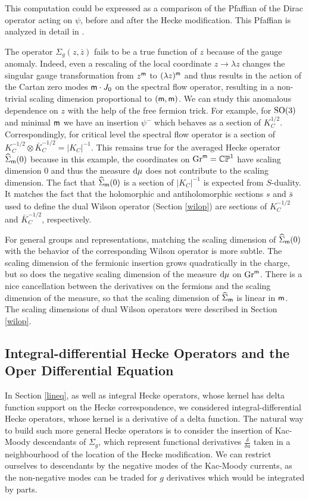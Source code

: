 \documentclass[11pt,a4paper]{article}
\begin{document}
This computation could be expressed as a comparison of the Pfaffian of the Dirac operator acting on $\psi$, before and after
the Hecke modification.  This Pfaffian is analyzed in detail in \cite{BD}.

The operator $\Sigma_{g}(z,\bar z)$ fails to be a true function of $z$ because of the gauge anomaly. Indeed, even a rescaling of the local coordinate $z \to \lambda z$ changes the singular gauge transformation from $z^{\sf m}$ to   $(\lambda z)^{\sf m}$ and thus results in the action of the Cartan zero modes ${\sf m} \cdot J_0$ on the spectral flow operator, resulting in a non-trivial scaling dimension proportional to $({\sf m},{\sf m})$. 
We can study this anomalous dependence on $z$ with the help of the free fermion trick. 
For example, for ${\mathrm{SO}}(3)$ and minimal ${\sf m}$ we have an insertion $\psi^-$ which behaves as a section of $K_C^{1/2}$. 
Correspondingly, for critical level the spectral flow operator is a section of $K_C^{-1/2}\otimes \bar K_C^{-1/2}=|K_C|^{-1}$.
This remains true for the averaged Hecke operator $\widehat\Sigma_{\sf m}(0)$ because in this example, the coordinates on ${\mathrm{Gr}}^{\sf m}={\mathbb{CP}}^1$ have scaling dimension $0$ and thus the measure $\mathrm d \mu$ does not contribute to the scaling dimension.    The fact that $\widehat\Sigma_{\sf m}(0)$ is a section of $|K_C|^{-1}$ is expected from $S$-duality.  It matches
the fact that the holomorphic and antiholomorphic sections $s$ and $\bar s$ used to define the dual Wilson operator (Section \ref{wilop}) are sections of $K_C^{-1/2}$
and $\bar K_C^{-1/2}$, respectively.

For general groups and representations, matching the scaling dimension of $\widehat\Sigma_{\sf m}(0)$ with the behavior of the corresponding Wilson
operator is more subtle.    The scaling dimension of the fermionic insertion grows quadratically in the charge, but so does the 
negative scaling dimension of the measure $\mathrm d\mu$ on ${\mathrm{Gr}}^{\sf m}$. There is a nice cancellation between the derivatives on the fermions and the scaling 
dimension of the measure, so that the scaling dimension of $\widehat\Sigma_{\sf m}$ is linear in ${\sf m}$.   The scaling dimensions of dual Wilson operators were 
described in Section \ref{wilop}.





\subsection{Integral-differential Hecke Operators and the Oper Differential Equation}\label{opde}

In Section \ref{lineq}, as well as integral Hecke operators, whose kernel has delta function support on the Hecke correspondence, 
we considered integral-differential Hecke operators,
whose kernel is a derivative of a delta function. 
The natural way to build such more general Hecke operators is to consider the insertion of Kac-Moody descendants of 
$\Sigma_{g}$, which represent functional derivatives $\frac{\delta}{\delta a}$ taken in a neighbourhood of the 
location of the Hecke modification. We can restrict ourselves to descendants by the negative modes of the Kac-Moody currents, 
as the non-negative modes can be traded for $g$ derivatives which would be integrated by parts. 
\end{document}
